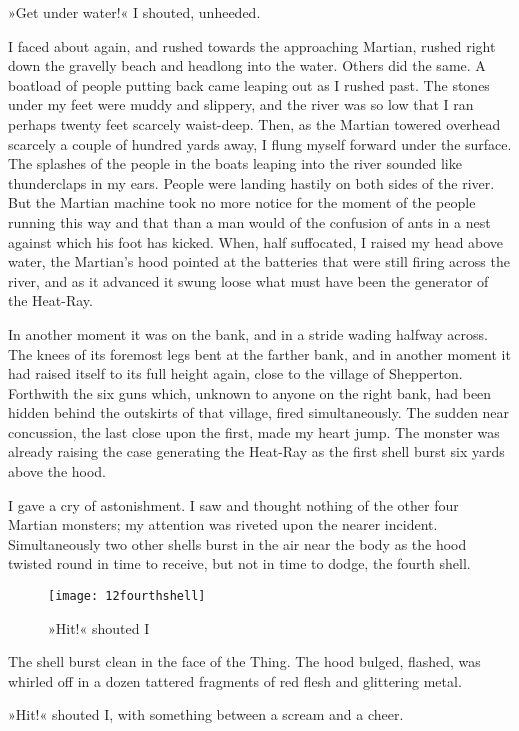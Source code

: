 »Get under water!« I shouted, unheeded.

I faced about again, and rushed towards the approaching Martian, rushed right down the gravelly beach and headlong into the water. Others did the same. A boatload of people putting back came leaping out as I rushed past. The stones under my feet were muddy and slippery, and the river was so low that I ran perhaps twenty feet scarcely waist-deep. Then, as the Martian towered overhead scarcely a couple of hundred yards away, I flung myself forward under the surface. The splashes of the people in the boats leaping into the river sounded like thunderclaps in my ears. People were landing hastily on both sides of the river. But the Martian machine took no more notice for the moment of the people running this way and that than a man would of the confusion of ants in a nest against which his foot has kicked. When, half suffocated, I raised my head above water, the Martian's hood pointed at the batteries that were still firing across the river, and as it advanced it swung loose what must have been the generator of the Heat-Ray.

In another moment it was on the bank, and in a stride wading halfway across. The knees of its foremost legs bent at the farther bank, and in another moment it had raised itself to its full height again, close to the village of Shepperton. Forthwith the six guns which, unknown to anyone on the right bank, had been hidden behind the outskirts of that village, fired simultaneously. The sudden near concussion, the last close upon the first, made my heart jump. The monster was already raising the case generating the Heat-Ray as the first shell burst six yards above the hood.

I gave a cry of astonishment. I saw and thought nothing of the other four Martian monsters; my attention was riveted upon the nearer incident. Simultaneously two other shells burst in the air near the body as the hood twisted round in time to receive, but not in time to dodge, the fourth shell.

\begin{figure}[tbp]
\centering
\texttt{[image: 12fourthshell]}
\caption{»Hit!« shouted I}
\end{figure}

The shell burst clean in the face of the Thing. The hood bulged, flashed, was whirled off in a dozen tattered fragments of red flesh and glittering metal.

»Hit!« shouted I, with something between a scream and a cheer.

